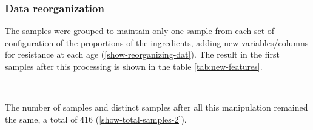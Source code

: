 \documentclass[]{article}
\begin{document}
\hypertarget{data-reorganization}{%
\subsubsection{Data reorganization}\label{data-reorganization}}

The samples were grouped to maintain only one sample from each set of
configuration of the proportions of the ingredients, adding new
variables/columns for resistance at each age
(\ref{show-reorganizing-dat}). The result in the first samples after
this processing is shown in the table \ref{tab:new-features}.

~

\begin{table}[H]

\caption{\label{tab:new-features}First 6 samples after reorganization}
\centering
{}
\end{table}

The number of samples and distinct samples after all this manipulation
remained the same, a total of 416 (\ref{show-total-samples-2}).
\end{document}
